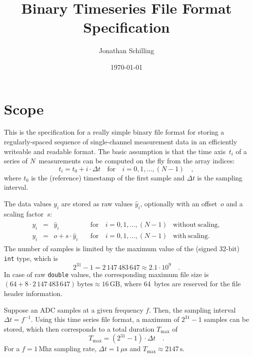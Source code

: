 \documentclass[a4paper,10pt]{article}
\title{Binary Timeseries File Format Specification}
\author{Jonathan Schilling}
\date{\today}
\begin{document}
\maketitle

\section{Scope}\label{sec:scope}

This is the specification for a really simple binary file format for storing a regularly-spaced sequence of single-channel measurement data
in an efficiently writeable and readable format.
The basic assumption is that the time axis~$t_i$ of a series of $N$~measurements can be computed on the fly from the array indices:
\begin{equation}
  t_i = t_0 + i \cdot \Delta t \quad \mathrm{for} \quad i = 0, 1, ..., (N-1) \quad ,
\end{equation}
where $t_0$ is the (reference) timestamp of the first sample and $\Delta t$ is the sampling interval.

The data values $y_i$ are stored as raw values $\hat{y}_i$, optionally with an offset~$o$ and a scaling factor~$s$:
\begin{gather}
\begin{aligned}
  y_i & = &             \hat{y}_i & \quad \mathrm{for} \quad i = 0, 1, ..., (N-1) & \mathrm{without~scaling,} \\
  y_i & = & o + s \cdot \hat{y}_i & \quad \mathrm{for} \quad i = 0, 1, ..., (N-1) & \mathrm{with~scaling.}
\end{aligned}
\end{gather}
The number of samples is limited by the maximum value of the (signed 32-bit) \texttt{int} type, which is
\begin{equation}
  2^{31} - 1 = 2\,147\,483\,647 \approx 2.1 \cdot 10^9 \quad .
\end{equation}
In case of raw \texttt{double} values, the corresponding maximum file size is $(64 + 8 \cdot 2\,147\,483\,647)\,\mathrm{bytes} \approx 16\,\mathrm{GB}$,
where 64~bytes are reserved for the file header information.

Suppose an ADC samples at a given frequency $f$. Then, the sampling interval $\Delta t = f^{-1}$.
Using this time series file format, a maximum of $2^{31}-1$ samples can be stored, which then corresponds to a
total duration $T_\mathrm{max}$ of
\begin{equation}
  T_\mathrm{max} = (2^{31}-1) \cdot \Delta t \quad .
\end{equation}
For a $f = 1\,\mathrm{Mhz}$ sampling rate, $\Delta t = 1\,\mu\mathrm{s}$ and $T_\mathrm{max} \approx 2147\,\mathrm{s}$.
\end{document}

